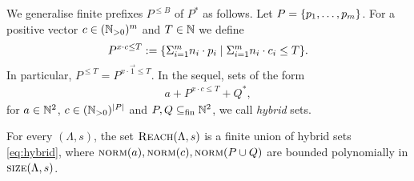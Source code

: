 \begin{appendixproof}
%
We generalise finite prefixes $P^{\leq B}$ of $P^*$ as follows.
Let $P = \{p_1, \ldots, p_m\}$. 
For a positive vector $c \in (\mathbb{N}_{>0})^m$ and $T \in \mathbb{N}$ we define
\[
P^{x \cdot c \leq T} := \{\Sigma_{i=1}^m n_i \cdot p_i \mid \Sigma_{i=1}^m n_i \cdot c_i \leq T\}.
\]
In particular, $P^{\leq T} = P^{x\cdot \vec 1  \leq T}$.
In the sequel, sets of the form
\begin{align} \label{eq:hybrid}
a + P^{x \cdot c \leq T} + Q^*,
\end{align}
for $a\in\mathbb{N}^2$, $c \in (\mathbb{N}_{>0})^{\left|P\right|}$ and $P,Q\subseteq_{\textup{fin}} \mathbb{N}^2$, 
we call \emph{hybrid} sets.


\begin{lemma}\label{lem:sandwich-raw}
For every \dslps $(\Lambda,s)$,
the set $\textsc{Reach}(\Lambda,s)$ is a finite union of hybrid sets \eqref{eq:hybrid}, 
where $\textsc{norm}(a),  \textsc{norm}(c), \textsc{norm}(P \cup Q)$ are bounded polynomially in $\textsc{size}(\Lambda,s)$.
\end{lemma}


\end{appendixproof}
